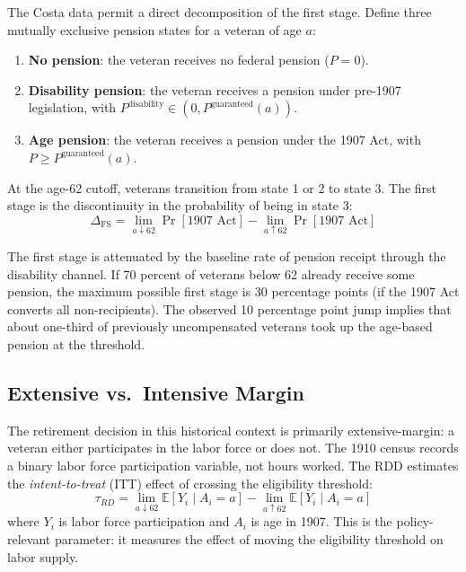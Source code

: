 \documentclass[12pt]{article}
\newcommand{\E}{\mathbb{E}}
\begin{document}
The Costa data permit a direct decomposition of the first stage. Define three mutually exclusive pension states for a veteran of age $a$:

\begin{enumerate}
\item \textbf{No pension}: the veteran receives no federal pension ($P = 0$).
\item \textbf{Disability pension}: the veteran receives a pension under pre-1907 legislation, with $P^{\text{disability}} \in (0, P^{\text{guaranteed}}(a))$.
\item \textbf{Age pension}: the veteran receives a pension under the 1907 Act, with $P \geq P^{\text{guaranteed}}(a)$.
\end{enumerate}

At the age-62 cutoff, veterans transition from state 1 or 2 to state 3. The first stage is the discontinuity in the probability of being in state 3:
\begin{equation}
\Delta_{\text{FS}} = \lim_{a \downarrow 62} \Pr[\text{1907 Act}] - \lim_{a \uparrow 62} \Pr[\text{1907 Act}]
\end{equation}

The first stage is attenuated by the baseline rate of pension receipt through the disability channel. If 70 percent of veterans below 62 already receive some pension, the maximum possible first stage is 30 percentage points (if the 1907 Act converts all non-recipients). The observed 10 percentage point jump implies that about one-third of previously uncompensated veterans took up the age-based pension at the threshold.

\subsection{Extensive vs.\ Intensive Margin}

The retirement decision in this historical context is primarily extensive-margin: a veteran either participates in the labor force or does not. The 1910 census records a binary labor force participation variable, not hours worked. The RDD estimates the \textit{intent-to-treat} (ITT) effect of crossing the eligibility threshold:
\begin{equation}
\tau_{RD} = \lim_{a \downarrow 62} \E[Y_i \mid A_i = a] - \lim_{a \uparrow 62} \E[Y_i \mid A_i = a]
\end{equation}
where $Y_i$ is labor force participation and $A_i$ is age in 1907. This is the policy-relevant parameter: it measures the effect of moving the eligibility threshold on labor supply.
\end{document}

